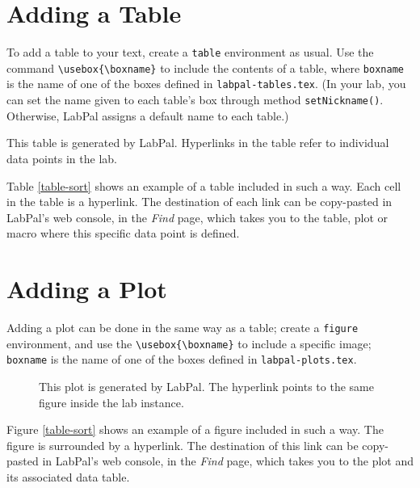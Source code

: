 \documentclass[utf8,twocolumn]{article}
\begin{document}
\section*{Adding a Table}

To add a table to your text, create a \texttt{table} environment as usual. Use
the command \verb+\usebox{\boxname}+ to include the contents of a table, where
\verb+boxname+ is the name of one of the boxes defined in
\verb+labpal-tables.tex+. (In your lab, you can set the name given to each
table's box through method \verb+setNickname()+. Otherwise, LabPal assigns a
default name to each table.)

\begin{table}
\centering
\usebox{\sorttime}
\caption{This table is generated by LabPal. Hyperlinks in the table refer to
individual data points in the lab.}
\label{table-sort}
\end{table}

Table \ref{table-sort} shows an example of a table included in such a way. Each
cell in the table is a hyperlink. The destination of each link can be
copy-pasted in LabPal's web console, in the \textsl{Find} page, which takes you
to the table, plot or macro where this specific data point is defined.

\section*{Adding a Plot}

Adding a plot can be done in the same way as a table; create a \texttt{figure}
environment, and use the \verb+\usebox{\boxname}+ to include a specific image;
\verb+boxname+ is the name of one of the boxes defined in
\verb+labpal-plots.tex+.

\begin{figure}
\centering
\usebox{\sortplot}
\caption{This plot is generated by LabPal. The hyperlink points to the same
figure inside the lab instance.}
\end{figure}

Figure \ref{table-sort} shows an example of a figure included in such a way. The
figure is surrounded by a hyperlink. The destination of this link can be
copy-pasted in LabPal's web console, in the \textsl{Find} page, which takes you
to the plot and its associated data table.
\end{document}
